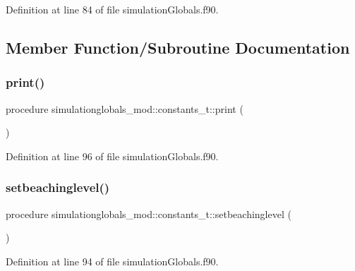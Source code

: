 Definition at line 84 of file simulation\+Globals.\+f90.



\subsection{Member Function/\+Subroutine Documentation}
\mbox{\label{structsimulationglobals__mod_1_1constants__t_a287a252cb5c736b4da24d79cf9c59897}} 
\subsubsection{\texorpdfstring{print()}{print()}}
{\footnotesize\ttfamily procedure simulationglobals\+\_\+mod\+::constants\+\_\+t\+::print (\begin{DoxyParamCaption}{ }\end{DoxyParamCaption})\hspace{0.3cm}{\ttfamily [private]}}



Definition at line 96 of file simulation\+Globals.\+f90.

\mbox{\label{structsimulationglobals__mod_1_1constants__t_a29fa4fda8d4382821d48942ea8232c15}} 
\subsubsection{\texorpdfstring{setbeachinglevel()}{setbeachinglevel()}}
{\footnotesize\ttfamily procedure simulationglobals\+\_\+mod\+::constants\+\_\+t\+::setbeachinglevel (\begin{DoxyParamCaption}{ }\end{DoxyParamCaption})\hspace{0.3cm}{\ttfamily [private]}}



Definition at line 94 of file simulation\+Globals.\+f90.

